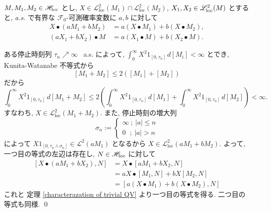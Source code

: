 \documentclass{ltjsarticle}
\begin{document}
\begin{prp}
	\( M, M_1, M_2 \in \mathscr{H}_{\mathrm{loc}} \) とし, 
	\( X \in \mathscr{L}^2_{\mathrm{loc}}(M_1) \cap \mathscr{L}^2_{\mathrm{loc}}(M_2) \),
	\( X_1, X_2 \in \mathscr{L}^2_{\mathrm{loc}}(M) \) とすると,
	\textit{a.s.} で有界な \( \mathscr{F}_0 \)-可測確率変数に \( a,b \) に対して
	\begin{align*}
		X \bullet ( a M_1 + b M_2 ) & =	a ( X \bullet M_1 ) + b ( X \bullet M_2 ),
		\\
		( a X_1 + b X_2 ) \bullet M & =	a ( X_1 \bullet M ) + b ( X_2 \bullet M ).
	\end{align*}
\end{prp}

\begin{prf}
	ある停止時刻列 \( \tau_n \nearrow \infty \) \ a.s. によって, 
	\( \int_0^{\infty} X^2 1_{ [0,\tau_n] } \, d[M_i] < \infty \) とでき,
	Kunita-Watanabe 不等式から
	\[
		[ M_1 + M_2] \le 2 \left( [M_1] + [M_2] \right)
	\]
	だから
	\[
		\int_0^{\infty} X^2 1_{ [0,\tau_n] } \, d[ M_1 + M_2]
		\le
		2 \left(
		\int_0^{\infty} X^2 1_{ [0,\tau_n] } \, d[ M_1 ]
		+
		\int_0^{\infty} X^2 1_{ [0,\tau_n] } \, d[ M_2 ]
		\right)
		< \infty.
	\]
	すなわち, 
	\( X \in \mathscr{L}^2_{\mathrm{loc}}( M_1 + M_2 ) \).
	また, 停止時刻の増大列
	\[
		\sigma_n :=	\begin{cases}
			\infty	\ ; \ |a| \le n \\
			0		\, \ \ ; \ |a| > n
		\end{cases}
	\]
	によって \( X 1_{ [0, \tau_n \wedge \sigma_n] } \in \mathscr{L}^2( a M_1) \)
	となるから
	\( X \in \mathscr{L}^2_{\mathrm{loc}}( a M_1 + b M_2 ) \).
	よって, 一つ目の等式の左辺は存在し, \( N \in \mathscr{H}_{\mathrm{loc}} \) に対して
	\begin{equation}
		\begin{aligned}
			[ X \bullet \left( a M_1 + b X_2 \right), N] & =	X \bullet [ a M_1 + b X_2, N]                    \\
			                                             & =	a X \bullet [M_1, N] + b X [M_2, N]              \\
			                                             & =	[ a ( X \bullet M_1 ) + b ( X \bullet M_2 ), N]
		\end{aligned}
	\end{equation}
	これと 定理 \ref{characterazation of trivial QV} より一つ目の等式を得る. 二つ目の等式も同様.
	\qed\end{prf}
\end{document}
